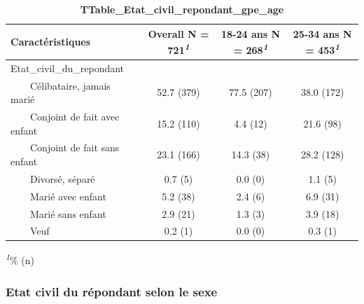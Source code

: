 \documentclass[
]{article}
\begin{document}
\newpage
\begin{table}[!t]
\caption{\label{tab:unnamed-chunk-26}\textbf{TTable\_Etat\_civil\_repondant\_gpe\_age}} 
\fontsize{12.0pt}{14.4pt}\selectfont
\begin{tabular*}{\linewidth}{@{\extracolsep{\fill}}lccc}
\toprule
\textbf{Caractéristiques} & \textbf{Overall}  N = 721\textsuperscript{\textit{1}} & \textbf{18-24 ans}  N = 268\textsuperscript{\textit{1}} & \textbf{25-34 ans}  N = 453\textsuperscript{\textit{1}} \\ 
\midrule\addlinespace[2.5pt]
Etat\_civil\_du\_repondant &  &  &  \\ 
    Célibataire, jamais marié & 52.7 (379) & 77.5 (207) & 38.0 (172) \\ 
    Conjoint de fait avec enfant & 15.2 (110) & 4.4 (12) & 21.6 (98) \\ 
    Conjoint de fait sans enfant & 23.1 (166) & 14.3 (38) & 28.2 (128) \\ 
    Divorsé, séparé & 0.7 (5) & 0.0 (0) & 1.1 (5) \\ 
    Marié avec enfant & 5.2 (38) & 2.4 (6) & 6.9 (31) \\ 
    Marié sans enfant & 2.9 (21) & 1.3 (3) & 3.9 (18) \\ 
    Veuf & 0.2 (1) & 0.0 (0) & 0.3 (1) \\ 
\bottomrule
\end{tabular*}
\begin{minipage}{\linewidth}
\textsuperscript{\textit{1}}\% (n)\\
\end{minipage}
\end{table}

\vspace{2cm}

\hypertarget{etat-civil-du-ruxe9pondant-selon-le-sexe}{%
\subsubsection{Etat civil du répondant selon le
sexe}\label{etat-civil-du-ruxe9pondant-selon-le-sexe}}
\end{document}
